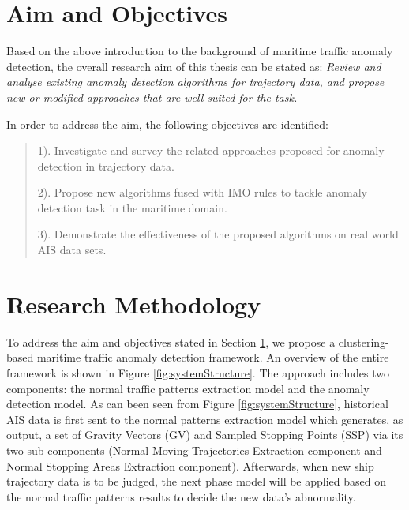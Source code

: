 \documentclass[12pt,glossary]{dalcsthesis}
\begin{document}
\section{Aim and Objectives}
\label{sec:aim_and_objectives}

Based on the above introduction to the background of maritime traffic anomaly detection, the overall research aim of this thesis can be stated as:  \emph{Review and analyse existing anomaly detection algorithms for trajectory data, and propose new or modified approaches that are well-suited for the task.}

In order to address the aim, the following objectives are identified:

\begin{quote}
1). Investigate and survey the related approaches proposed for anomaly detection in trajectory data.

2). Propose new algorithms fused with IMO rules to tackle anomaly detection task in the maritime domain.

3). Demonstrate the effectiveness of the proposed algorithms on real world AIS data sets.

\end{quote}


\section{Research Methodology}
To address the aim and objectives stated in Section \ref{sec:aim_and_objectives}, we propose a clustering-based maritime traffic anomaly detection framework. An overview of the entire framework  is shown in Figure \ref{fig:systemStructure}.
The approach includes two components: the normal traffic patterns extraction model and the anomaly detection model. As can been seen from Figure \ref{fig:systemStructure}, historical AIS data is first sent to the normal patterns extraction model which generates, as output, a set of Gravity Vectors (GV) and Sampled Stopping Points (SSP) via its two sub-components (Normal Moving Trajectories Extraction component and Normal Stopping Areas Extraction component). Afterwards, when new ship trajectory data is to be judged, the next phase model will be applied based on the normal traffic patterns results to decide the new data's abnormality. 
\end{document}
